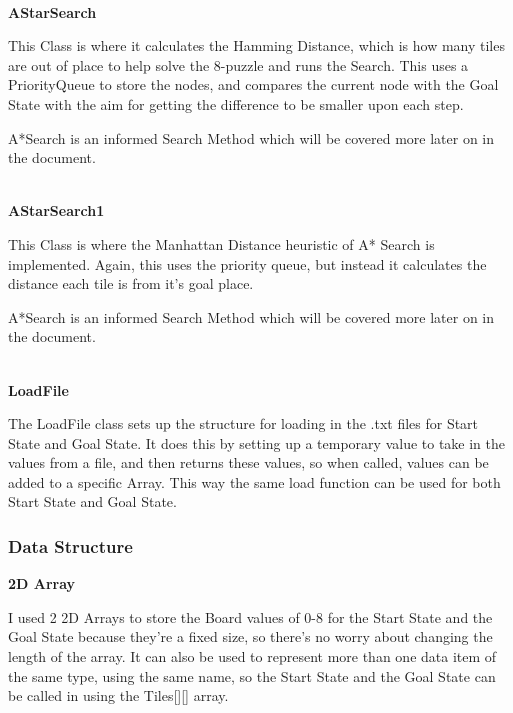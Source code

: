 \documentclass[11pt]{article} %
\begin{document}
	\newpage
		\setlength{\parindent}{0pt} %
		\hspace{0pt} \\
		\textbf{AStarSearch}
	
		This Class is where it calculates the Hamming Distance, which is how many tiles are out of place to help solve the 8-puzzle and runs the Search. This uses a PriorityQueue to store the nodes, and compares the current node with the Goal State with the aim for getting the difference to be smaller upon each step. 
	
		\setlength{\parindent}{15pt} %
		A*Search is an informed Search Method which will be covered more later on in the document.
	
		\hspace{0pt} \\
		\textbf{AStarSearch1}
	
		This Class is where the Manhattan Distance heuristic of A* Search is implemented. Again, this uses the priority queue, but instead it calculates the distance each tile is from it's goal place.

		\setlength{\parindent}{15pt} %
		A*Search is an informed Search Method which will be covered more later on in the document. 
	
		\hspace{0pt} \\
		\textbf{LoadFile}
	
		The LoadFile class sets up the structure for loading in the .txt files for Start State and Goal State. It does this by setting up a temporary value to take in the values from a file, and then returns these values, so when called, values can be added to a specific Array. This way the same load function can be used for both Start State and Goal State.
	
	\newpage
			\subsubsection{Data Structure}

				\textbf{2D Array}
				\setlength{\parindent}{0pt} %

				I used 2 2D Arrays to store the Board values of 0-8 for the Start State and the Goal State because they're a fixed size, so there's no worry about changing the length of the array. It can also be used to represent more than one data item of the same type, using the same name, so the Start State and the Goal State can be called in using the Tiles[][] array.
\end{document}
